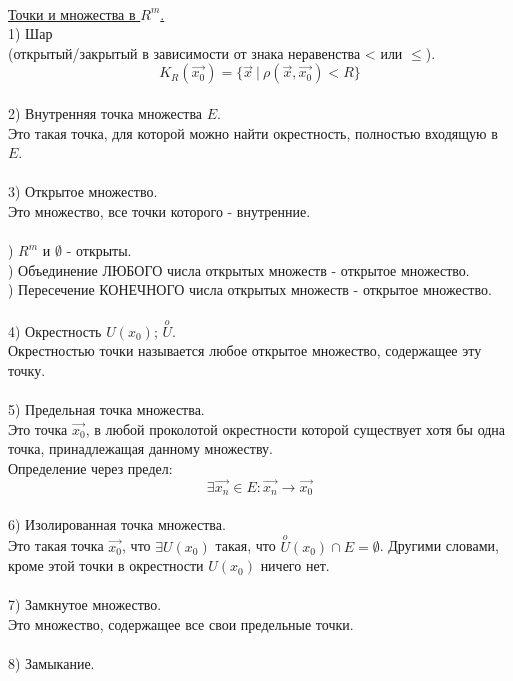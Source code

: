 \documentclass[12pt]{article}
\begin{document}
\\
\label{question1_2}\underline{Точки и множества в $R^m$.}\\
1) Шар\\
(открытый/закрытый в зависимости от знака неравенства < или $\leq$).\\
$$K_R (\overrightarrow{x_0}) = \{ \overrightarrow{x} \ | \ \rho (\overrightarrow{x}, \overrightarrow{x_0}) < R \}$$
\\
2) Внутренняя точка множества $E$.\\
Это такая точка, для которой можно найти окрестность, полностью входящую в $E$.\\
\\
3) Открытое множество.\\
Это множество, все точки которого - внутренние.\\
\\
) $R^m$ и $\emptyset$ - открыты.\\
) Объединение ЛЮБОГО числа открытых множеств - открытое множество.\\
) Пересечение КОНЕЧНОГО числа открытых множеств - открытое множество.\\
\\
4) Окрестность $U(x_0)$; $\overset{o}{U}$.\\
Окрестностью точки называется любое открытое множество, содержащее эту точку.\\
\\
5) Предельная точка множества.\\
Это точка $\overrightarrow{x_0}$, в любой проколотой окрестности которой существует хотя бы одна точка, принадлежащая данному множеству.\\
Определение через предел:\\
$$\exists \overrightarrow{x_n} \in E: \overrightarrow{x_n} \rightarrow \overrightarrow{x_0}$$
\\
6) Изолированная точка множества.\\
Это такая точка $\overrightarrow{x_0}$, что $\exists U (x_0)$ такая, что $\overset{o}{U} (x_0) \cap E = \emptyset$. Другими словами, кроме этой точки в окрестности $U (x_0)$ ничего нет.\\
\\
7) Замкнутое множество.\\
Это множество, содержащее все свои предельные точки.\\
\\
8) Замыкание.\\
\end{document}
